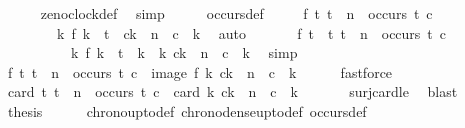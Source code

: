 \begin{isabellebody}
\ \ \ \ \isamarkupfalse%
\ zeno{\isacharunderscore}clock{\isacharunderscore}def\ \isamarkupfalse%
\ simp\isanewline
\ \ \isamarkupfalse%
\ \isamarkupfalse%
\ occurs{\isacharunderscore}def\ \isamarkupfalse%
\isanewline
\ \ \ \ {\isacartoucheopen}{\isasymexists}f{\isachardot}\ {\isasymforall}t{\isachardot}\ t\ {\isasymle}\ n\ {\isasymand}\ occurs\ t\ c\ {\isasymlongrightarrow}\isanewline
\ \ \ \ \ \ \ \ {\isacharparenleft}{\isasymexists}k{\isachardot}\ f\ k\ {\isacharequal}\ t\ {\isasymand}\ c\isactrlbsub k\isactrlesub \ {\isasymle}\ n\ {\isasymand}\ c\ {\isasymnabla}\ k{\isacharparenright}{\isacartoucheclose}\ \isamarkupfalse%
\ auto\isanewline
\ \ \isamarkupfalse%
\isanewline
\ \ \ \ {\isacartoucheopen}{\isasymexists}f{\isachardot}\ {\isasymforall}t\ {\isasymin}\ {\isacharbraceleft}t{\isachardot}\ t\ {\isasymle}\ n\ {\isasymand}\ occurs\ t\ c{\isacharbraceright}{\isachardot}\isanewline
\ \ \ \ \ \ \ \ \ \ {\isasymexists}k{\isachardot}\ f\ k\ {\isacharequal}\ t\ {\isasymand}\ k\ {\isasymin}\ {\isacharbraceleft}k{\isachardot}\ c\isactrlbsub k\isactrlesub \ {\isasymle}\ n\ {\isasymand}\ c\ {\isasymnabla}\ k{\isacharbraceright}{\isacartoucheclose}\ \isamarkupfalse%
\ simp\isanewline
\ \ \isamarkupfalse%
\ {\isacartoucheopen}{\isasymexists}f{\isachardot}\ {\isacharbraceleft}t{\isachardot}\ t\ {\isasymle}\ n\ {\isasymand}\ occurs\ t\ c{\isacharbraceright}\ {\isasymsubseteq}\ image\ f\ {\isacharbraceleft}k{\isachardot}\ c\isactrlbsub k\isactrlesub \ {\isasymle}\ n\ {\isasymand}\ c\ {\isasymnabla}\ k{\isacharbraceright}{\isacartoucheclose}\isanewline
\ \ \ \ \isamarkupfalse%
\ fastforce\isanewline
\ \ \isamarkupfalse%
\ \isamarkupfalse%
\ {\isacartoucheopen}card\ {\isacharbraceleft}t{\isachardot}\ t\ {\isasymle}\ n\ {\isasymand}\ occurs\ t\ c{\isacharbraceright}\ {\isasymle}\ card\ {\isacharbraceleft}k{\isachardot}\ c\isactrlbsub k\isactrlesub \ {\isasymle}\ n\ {\isasymand}\ c\ {\isasymnabla}\ k{\isacharbraceright}{\isacartoucheclose}\isanewline
\ \ \ \ \isamarkupfalse%
\ \ surj{\isacharunderscore}card{\isacharunderscore}le\ \isamarkupfalse%
\ blast\isanewline
\ \ \isamarkupfalse%
\ {\isacharquery}thesis\isanewline
\ \ \ \ \isamarkupfalse%
\ chrono{\isacharunderscore}up{\isacharunderscore}to{\isacharunderscore}def\ chrono{\isacharunderscore}dense{\isacharunderscore}up{\isacharunderscore}to{\isacharunderscore}def\ occurs{\isacharunderscore}def\ \isamarkupfalse%

\end{isabellebody}
